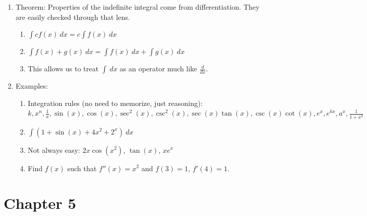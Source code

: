 \documentclass{article}
\newcommand{\ds}{\displaystyle}
\begin{document}
\begin{enumerate}
\item Theorem: Properties of the indefinite integral come from differentiation. They are easily checked through that lens.
\begin{enumerate}
\item $\ds \int cf(x) ~dx = c\int f(x) ~dx$
\item $\ds \int f(x) + g(x) ~dx = \int f(x) ~dx + \int g(x)~ dx$
\item This allows us to treat $\int ~dx$ as an operator much like $\frac{d}{dx}$.
\end{enumerate}

\item Examples:
\begin{enumerate}
\item Integration rules (no need to memorize, just reasoning): $k, x^n, \frac{1}{x}, \sin(x), \cos(x), \sec^2(x), \csc^2(x), \sec(x)\tan(x), \csc(x)\cot(x), e^x, e^{kx}, a^x, \frac{1}{1+x^2}$
\item $\int( 1+\sin(x)+4x^2+2^x) ~dx$ 
\item Not always easy: $2x\cos(x^2)$, $\tan(x)$, $xe^x$
\item Find $f(x)$ such that $f''(x) = x^2$ and $f(3)=1$, $f'(4)=1$.
\end{enumerate}
\end{enumerate}


\section{Chapter 5}
\end{document}
